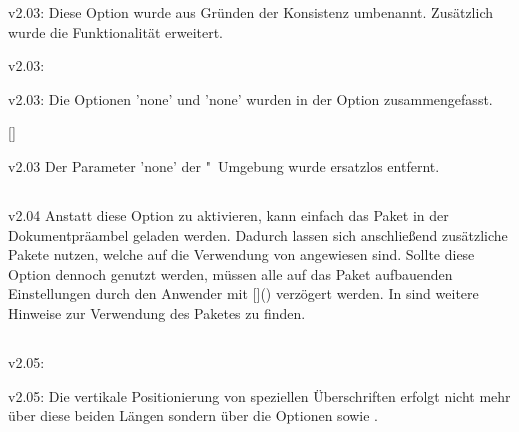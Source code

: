 \begin{Cessation}{v2.03:}{}
\printobsoletelist%
%
Diese Option wurde aus Gründen der Konsistenz umbenannt. Zusätzlich wurde die 
Funktionalität erweitert.
\end{Cessation}

\begin{Cessation}{v2.03:}{}
\begin{Cessation}{v2.03:}{}
\printobsoletelist%
%
Die Optionen 'none' und 'none' wurden in der 
Option  zusammengefasst.
\end{Cessation}
\end{Cessation}

\begin{Cessation}{}{[]}
\begin{Cessation}{v2.03}{}
\printobsoletelist%
%
Der Parameter 'none' der 
"~Umgebung wurde ersatzlos entfernt.
\end{Cessation}
\end{Cessation}


\subsection{}
\begin{Cessation}{v2.04}{}%
\printobsoletelist%
%
Anstatt diese Option zu aktivieren, kann einfach das Paket  
in der Dokumentpräambel geladen werden. Dadurch lassen sich anschließend 
zusätzliche Pakete nutzen, welche auf die Verwendung von  
angewiesen sind. Sollte diese Option dennoch genutzt werden, müssen alle auf 
das Paket  aufbauenden Einstellungen durch den Anwender mit 
[\MPValue{\dots}]() 
verzögert werden. In  sind weitere Hinweise zur Verwendung 
des Paketes  zu finden.
\end{Cessation}


\subsection{}
\begin{Cessation}{v2.05:}{}
\begin{Cessation}{v2.05:}{}
\printobsoletelist%
%
Die vertikale Positionierung von speziellen Überschriften erfolgt nicht mehr 
über diese beiden Längen sondern über die Optionen  
sowie .
\end{Cessation}
\end{Cessation}


